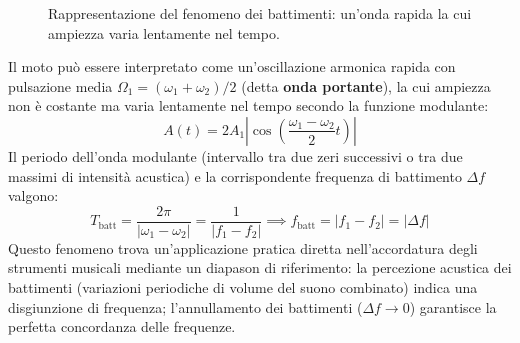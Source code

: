 \begin{figure}[ht]
\centering
{}
\caption{Rappresentazione del fenomeno dei battimenti: un'onda rapida la cui ampiezza varia lentamente nel tempo.}
\end{figure}

Il moto può essere interpretato come un'oscillazione armonica rapida con pulsazione media $\Omega_1 = (\omega_1 + \omega_2)/2$ (detta \textbf{onda portante}), la cui ampiezza non è costante ma varia lentamente nel tempo secondo la funzione modulante:
\begin{equation}
    A(t) = 2A_1 \left| \cos\left( \frac{\omega_1 - \omega_2}{2} t \right) \right|
\end{equation}
Il periodo dell'onda modulante (intervallo tra due zeri successivi o tra due massimi di intensità acustica) e la corrispondente frequenza di battimento $\Delta f$ valgono:
\begin{equation}
    T_{\text{batt}} = \frac{2\pi}{|\omega_1 - \omega_2|} = \frac{1}{|f_1 - f_2|} \implies f_{\text{batt}} = |f_1 - f_2| = |\Delta f|
\end{equation}
Questo fenomeno trova un'applicazione pratica diretta nell'accordatura degli strumenti musicali mediante un diapason di riferimento: la percezione acustica dei battimenti (variazioni periodiche di volume del suono combinato) indica una disgiunzione di frequenza; l'annullamento dei battimenti ($\Delta f \to 0$) garantisce la perfetta concordanza delle frequenze.





